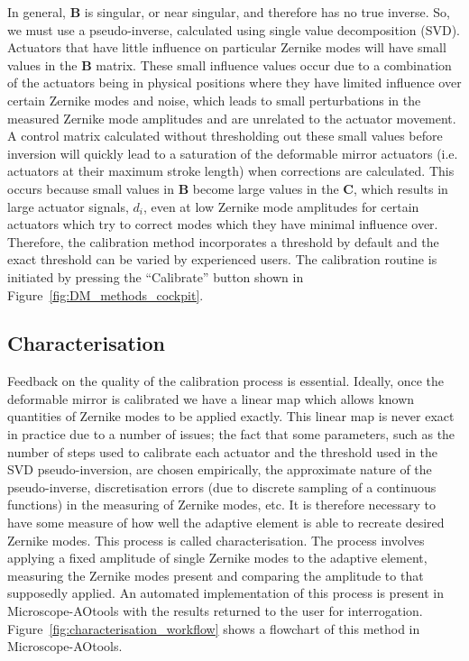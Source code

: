 In general, $\boldsymbol{B}$ is singular, or near singular, and therefore has 
no true inverse. So, we must use a pseudo-inverse, calculated using single 
value decomposition (SVD). Actuators that have little influence on particular 
Zernike modes will have small values in the $\boldsymbol{B}$ matrix. These 
small influence values occur due to a combination of the actuators being in 
physical positions where they have limited influence over certain Zernike 
modes and noise, which leads to small perturbations in the measured Zernike 
mode amplitudes and are unrelated to the actuator movement. A control matrix 
calculated without thresholding out these small values before inversion will 
quickly lead to a saturation of the deformable mirror  actuators (i.e. 
actuators at their maximum stroke length) when corrections are 
calculated\cite{booth2005methods}. This occurs because small values in 
$\boldsymbol{B}$ become large values in the $\boldsymbol{C}$, which results 
in large actuator signals, $d_{i}$, even at low Zernike mode amplitudes for 
certain actuators which try to correct modes which they have minimal 
influence over. Therefore, the calibration method incorporates a threshold by 
default and the exact threshold can be varied by experienced users. The 
calibration routine is initiated by pressing the ``Calibrate'' button shown in 
Figure~\ref{fig:DM_methods_cockpit}.

\subsection{Characterisation}
\label{subsec:characterisation}

Feedback on the quality of the calibration process is essential. Ideally, once the deformable mirror is calibrated we have a linear map which allows known quantities of Zernike modes to be applied exactly. This linear map is never exact in practice due to a number of issues; the fact that some parameters, such as the number of steps used to calibrate each actuator and the threshold used in the SVD pseudo-inversion, are chosen empirically, the approximate nature of the pseudo-inverse, discretisation errors (due to discrete sampling of a continuous functions) in the measuring of Zernike modes, etc. It is therefore necessary to have some measure of how well the adaptive element is able to recreate desired Zernike modes. This process is called characterisation. The process involves applying a fixed amplitude of single Zernike modes to the adaptive element, measuring the Zernike modes present and comparing the amplitude to that supposedly applied. An automated implementation of this process is present in Microscope-AOtools with the results returned to the user for interrogation. Figure~\ref{fig:characterisation_workflow} shows a flowchart of this method in Microscope-AOtools. 

